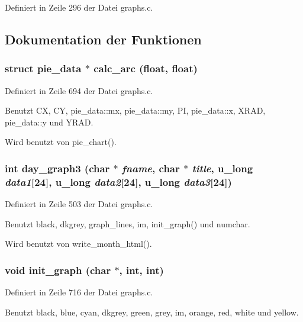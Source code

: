Definiert in Zeile 296 der Datei graphs.c.

\subsection{Dokumentation der Funktionen}
\subsubsection{\setlength{\rightskip}{0pt plus 5cm}struct {\bf pie\_\-data} $\ast$ calc\_\-arc (float, float)}\label{graphs_8c_b831d5a0b0198ea523e0b116aaa20488}




Definiert in Zeile 694 der Datei graphs.c.

Benutzt CX, CY, pie\_\-data::mx, pie\_\-data::my, PI, pie\_\-data::x, XRAD, pie\_\-data::y und YRAD.

Wird benutzt von pie\_\-chart().
\subsubsection{\setlength{\rightskip}{0pt plus 5cm}int day\_\-graph3 (char $\ast$ {\em fname}, char $\ast$ {\em title}, u\_\-long {\em data1}[24], u\_\-long {\em data2}[24], u\_\-long {\em data3}[24])}\label{graphs_8c_98296b41d7e2982e4b341e6ed18255ac}




Definiert in Zeile 503 der Datei graphs.c.

Benutzt black, dkgrey, graph\_\-lines, im, init\_\-graph() und numchar.

Wird benutzt von write\_\-month\_\-html().
\subsubsection{\setlength{\rightskip}{0pt plus 5cm}void init\_\-graph (char $\ast$, int, int)}\label{graphs_8c_2040d817b934e470b4a2cdeb9811c097}




Definiert in Zeile 716 der Datei graphs.c.

Benutzt black, blue, cyan, dkgrey, green, grey, im, orange, red, white und yellow.

